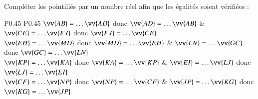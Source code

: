 \documentclass[oneside,12pt]{article}          %
\begin{document}
\begin{center}
\end{center}

Compléter les pointillés par un nombre réel afin que les égalités soient vérifiées :

\renewcommand{\arraystretch}{1.5}
\begin{tabular}{P{0.45\linewidth} P{0.45\linewidth}}
	$\vv{AB} = \ldots \vv{AD}$ \quad donc \quad $\vv{AD} = \ldots \vv{AB}$ & 
	$\vv{CE} = \ldots \vv{FJ}$ \quad donc \quad $\vv{FJ} = \ldots \vv{CE}$ \\
	$\vv{EH} = \ldots \vv{MD}$ \quad donc \quad $\vv{MD} = \ldots \vv{EH}$ &
	$\vv{LN} = \ldots \vv{GC}$ \quad donc \quad $\vv{GC} = \ldots \vv{LN}$ \\
	$\vv{KP} = \ldots \vv{KA}$ \quad donc \quad $\vv{KA} = \ldots \vv{KP}$ &
	$\vv{EI} = \ldots \vv{LJ}$ \quad donc \quad $\vv{LJ} = \ldots \vv{EI}$ \\
	$\vv{CF} = \ldots \vv{NP}$ \quad donc \quad $\vv{NP} = \ldots \vv{CF}$ &
	$\vv{JP} = \ldots \vv{KG}$ \quad donc \quad $\vv{KG} = \ldots \vv{JP}$ \\
\end{tabular}
\end{document}
